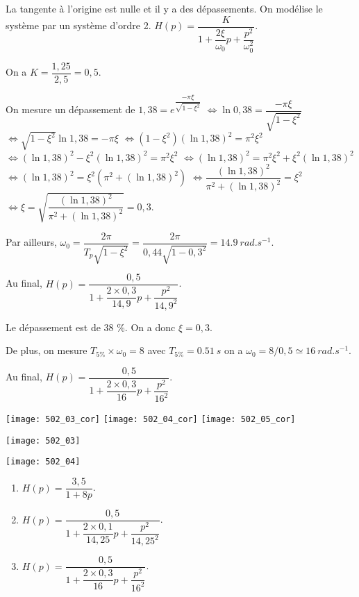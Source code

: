 La tangente à l'origine est nulle et il y a des dépassements. On modélise le système par un système d'ordre 2. 
$H(p)=\dfrac{K}{1+\dfrac{2\xi}{\omega_0}p+\dfrac{p^2}{\omega_0^2}}$.

On a $K= \dfrac{1,25}{2,5}=0,5$.


On mesure un dépassement de 
$1,38 = e^{\dfrac{-\pi \xi}{\sqrt{1-\xi^2}}}$
$\Leftrightarrow \ln 0,38 = \dfrac{-\pi \xi}{\sqrt{1-\xi^2}}$
$\Leftrightarrow \sqrt{1-\xi^2} \ln 1,38 = -\pi \xi$
$\Leftrightarrow (1-\xi^2) (\ln 1,38)^2= \pi^2 \xi^2$
$\Leftrightarrow (\ln 1,38)^2-\xi^2(\ln 1,38)^2 = \pi^2 \xi^2$
$\Leftrightarrow (\ln 1,38)^2 = \pi^2 \xi^2 + \xi^2(\ln 1,38)^2$
$\Leftrightarrow (\ln 1,38)^2 =\xi^2 \left(\pi^2  + (\ln 1,38)^2\right)$
$\Leftrightarrow \dfrac{(\ln 1,38)^2}{\pi^2  + (\ln 1,38)^2} =\xi^2 $
$\Leftrightarrow \xi = \sqrt{\dfrac{(\ln 1,38)^2}{\pi^2  +(\ln 1,38)^2}} =0,3 $.


Par ailleurs, $\omega_0 = \dfrac{2\pi }{T_p \sqrt{1-\xi^2}} =\dfrac{2\pi }{0,44 \sqrt{1-0,3^2}} = \SI{14,9}{rad.s^{-1}}$.

Au final, $H(p)=\dfrac{0,5}{1+\dfrac{2\times 0,3}{14,9}p+\dfrac{p^2}{14,9^2}}$.


\else
\fi



\ifprof
Le dépassement est de 38 \%. On a donc $\xi = 0,3$.

De plus, on mesure $T_{5\%}\times \omega_0 =8$ avec $T_{5\%}=\SI{0,51}{s}$ on a $\omega_0 = 8/0,5 \simeq \SI{16}{rad.s^{-1}}$.

Au final, $H(p)=\dfrac{0,5}{1+\dfrac{2\times 0,3}{16}p+\dfrac{p^2}{16^2}}$.
\begin{center}
\texttt{[image: 502\_03\_cor]}
\texttt{[image: 502\_04\_cor]}
\texttt{[image: 502\_05\_cor]}
\end{center}
\else
\begin{marginfigure}
\texttt{[image: 502\_03]}
\end{marginfigure}
\begin{marginfigure}
\texttt{[image: 502\_04]}
\end{marginfigure}
\fi


\ifprof
\else
\begin{solution}
\begin{enumerate}
\item  $H(p)=\dfrac{3,5}{1+8p}$.
\item $H(p)=\dfrac{0,5}{1+\dfrac{2\times 0,1}{14,25}p+\dfrac{p^2}{14,25^2}}$.
\item $H(p)=\dfrac{0,5}{1+\dfrac{2\times 0,3}{16}p+\dfrac{p^2}{16^2}}$.
\end{enumerate}
\end{solution}


\fi